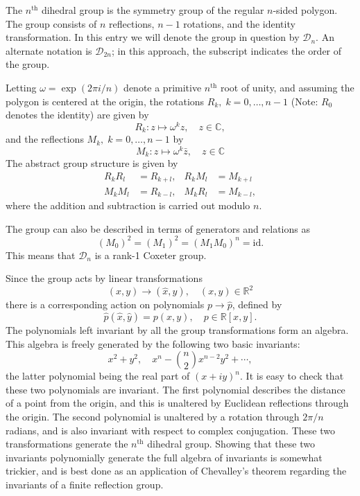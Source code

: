 \documentclass{article}
\newcommand{\reals}{\mathbb{R}}
\newcommand{\cnums}{\mathbb{C}}
\newcommand{\lp}{\left(}
\newcommand{\rp}{\right)}
\newcommand{\supth}{^{\text{th}}}
\newcommand{\cD}{\mathcal{D}}
\begin{document}
The $n^{\text{th}}$ dihedral group is the symmetry group of
the regular $n$-sided polygon.  The group consists of $n$ reflections,
$n-1$ rotations, and the identity transformation.  In this entry we will denote the group in question by
$\cD_n$.
An alternate notation is $\cD_{2n}$; in this approach, the subscript indicates the order of the group.  

Letting
$\omega=\exp(2\pi i/n)$ denote a primitive $n^{\text{th}}$ root of
unity, and assuming the polygon is centered at the origin, the
rotations $R_k,\; k=0,\ldots,n-1$ (Note: $R_0$ denotes the identity)
are given by
$$R_k:z \mapsto \omega^k z,\quad z\in\cnums,$$
and the reflections $M_k,\; k=0,\ldots,n-1$ by
$$M_k: z\mapsto \omega^k \bar{z},\quad z\in\cnums$$
The abstract group structure is given by
\begin{align*}
R_k R_l &= R_{k+l}, &  R_k M_l &= M_{k+l}\\
M_k M_l &= R_{k-l}, &  M_k R_l &= M_{k-l},
\end{align*}
where the addition and subtraction is carried out modulo $n$. 

The group can also be described in terms of generators and relations as
$$\lp M_0\rp^2 =\lp M_1\rp^2 = (M_1 M_0)^n = \mathrm{id}.$$
This means that $\cD_n$ is a rank-1 Coxeter group.

Since the group acts by linear transformations
$$(x,y)\to(\hat{x},\hat{y}),\quad (x,y)\in \reals^2$$
there is a
corresponding action on polynomials $p\to\hat{p}$, defined by
$$\hat{p}(\hat{x},\hat{y}) = p(x,y),\quad p\in \reals[x,y].$$
The polynomials
left invariant by all the group transformations form an algebra.  This
algebra is freely generated by the following two basic invariants:
$$x^2+y^2,\quad x^n-\binom{n}{2} x^{n-2}y^2 + \cdots,$$
the latter
polynomial being the real part of $(x+iy)^n$.  It is easy to check
that these two polynomials are invariant.  The first polynomial
describes the distance of a point from the origin, and this is
unaltered by Euclidean reflections through the origin.  The second
polynomial is unaltered by a rotation through $2\pi/n$ radians, and is
also invariant with respect to complex conjugation.  These two
transformations generate the $n\supth$ dihedral group.  Showing that
these two invariants polynomially generate the full algebra of
invariants is somewhat trickier, and is best done as an application of
Chevalley's theorem regarding the invariants of a finite reflection
group.
\end{document}
